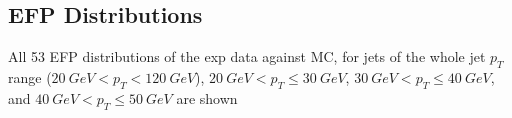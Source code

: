 \documentclass[12pt]{article}
\begin{document}
\begin{appendices}
\section{EFP Distributions}
\label{appendix:EFP_basis}
All 53 EFP distributions of the exp data against MC, for jets of the whole jet $p_T$ range ($20 \ GeV < p_T < 120 \ GeV$), $20 \ GeV < p_T \leq 30 \ GeV$, $30 \ GeV < p_T \leq 40 \ GeV$, and $40 \ GeV < p_T \leq 50 \ GeV$ are shown 
\begin{center}

\end{center}
\end{appendices}
\end{document}
